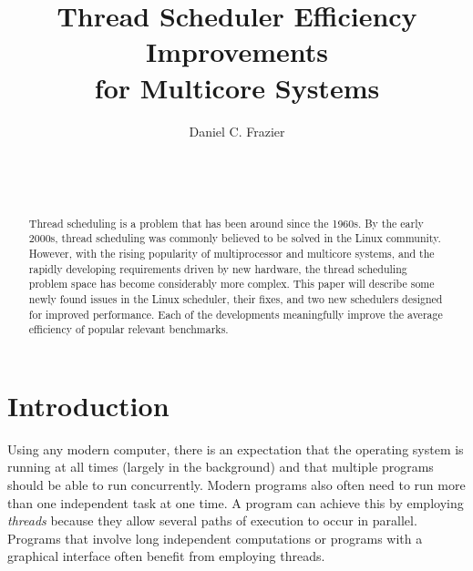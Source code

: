 \documentclass{sig-alternate}
\begin{document}

\title{Thread Scheduler Efficiency Improvements \\ for Multicore Systems}


\author{
\alignauthor
Daniel C. Frazier\\
	\\
	\\
	\\
}
\maketitle

\begin{abstract}

Thread scheduling is a problem that has been around since the 1960s. By the early 2000s, thread scheduling was commonly believed to be solved in the Linux community. However, with the rising popularity of multiprocessor and multicore systems, and the rapidly developing requirements driven by new hardware, the thread scheduling problem space has become considerably more complex. This paper will describe some newly found issues in the Linux scheduler, their fixes, and two new schedulers designed for improved performance. Each of the developments meaningfully improve the average efficiency of popular relevant benchmarks.

\end{abstract}


\section{Introduction}
\label{sec:intro}

Using any modern computer, there is an expectation that the operating system is running at all times (largely in the background) and that multiple programs should be able to run concurrently. Modern programs also often need to run more than one independent task at one time. A program can achieve this by employing \emph{threads} because they allow several paths of execution to occur in parallel. Programs that involve long independent computations or programs with a graphical interface often benefit from employing threads.
\end{document}
